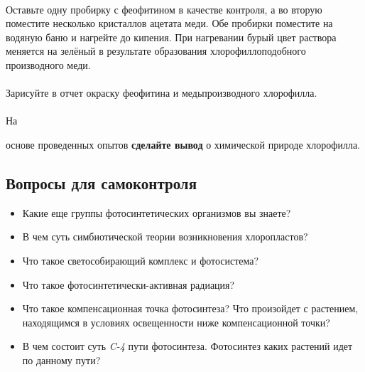 \paragraph*{}Оставьте одну пробирку с феофитином в качестве контроля, а во вторую поместите несколько кристаллов ацетата меди. Обе пробирки поместите на водяную баню и нагрейте до кипения. При нагревании бурый цвет раствора меняется на зелёный в результате образования хлорофиллоподобного производного меди.

\paragraph*{}Зарисуйте в отчет окраску феофитина и медьпроизводного хлорофилла.

\paragraph*{}\hypertarget{hlorpophilus_etherus}{На} основе проведенных опытов \textbf{сделайте вывод} о химической природе хлорофилла.

\subsection*{Вопросы для самоконтроля}

\begin{itemize}
 \item Какие еще группы фотосинтетических организмов вы знаете?
 \item В чем суть симбиотической теории возникновения хлоропластов?
 \item Что такое светособирающий комплекс и фотосистема?
 \item Что такое фотосинтетически-активная радиация?
 \item Что такое компенсационная точка фотосинтеза? Что произойдет с растением, находящимся в условиях освещенности ниже компенсационной точки?
 \item В чем состоит суть \textit{C-4} пути фотосинтеза. Фотосинтез каких растений идет по данному пути?
\end{itemize}

